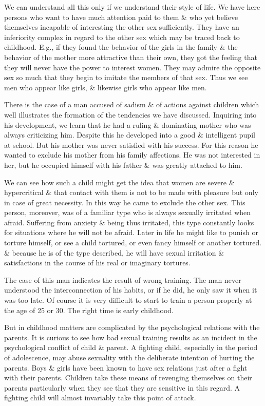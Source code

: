 \documentclass{article}
\begin{document}
We can understand all this only if we understand their style of life. We have here persons who want to have much attention paid to them \& who yet believe themselves incapable of interesting the other sex sufficiently. They have an inferiority complex in regard to the other sex which may be traced back to childhood. E.g., if they found the behavior of the girls in the family \& the behavior of the mother more attractive than their own, they got the feeling that they will never have the power to interest women. They may admire the opposite sex so much that they begin to imitate the members of that sex. Thus we see men who appear like girls, \& likewise girls who appear like men.

There is the case of a man accused of sadism \& of actions against children which well illustrates the formation of the tendencies we have discussed. Inquiring into his development, we learn that he had a ruling \& dominating mother who was always criticizing him. Despite this he developed into a good \& intelligent pupil at school. But his mother was never satisfied with his success. For this reason he wanted to exclude his mother from his family affections. He was not interested in her, but he occupied himself with his father \& was greatly attached to him.

We can see how such a child might get the idea that women are severe \& hypercritical \& that contact with them is not to be made with pleasure but only in case of great necessity. In this way he came to exclude the other sex. This person, moreover, was of a familiar type who is always sexually irritated when afraid. Suffering from anxiety \& being thus irritated, this type constantly looks for situations where he will not be afraid. Later in life he might like to punish or torture himself, or see a child tortured, or even fancy himself or another tortured. \& because he is of the type described, he will have sexual irritation \& satisfactions in the course of his real or imaginary tortures.

The case of this man indicates the result of wrong training. The man never understood the interconnection of his habits, or if he did, he only saw it when it was too late. Of course it is very difficult to start to train a person properly at the age of 25 or 30. The right time is early childhood.

But in childhood matters are complicated by the psychological relations with the parents. It is curious to see how bad sexual training results as an incident in the psychological conflict of child \& parent. A fighting child, especially in the period of adolescence, may abuse sexuality with the deliberate intention of hurting the parents. Boys \& girls have been known to have sex relations just after a fight with their parents. Children take these means of revenging themselves on their parents particularly when they see that they are sensitive in this regard. A fighting child will almost invariably take this point of attack.
\end{document}
